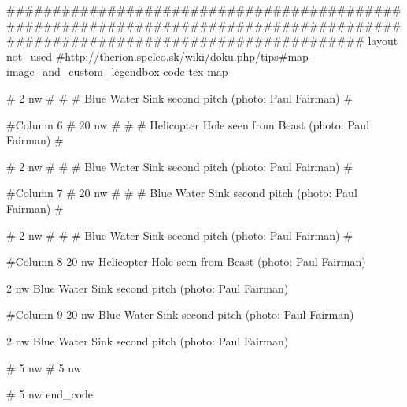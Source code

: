 #############################################################################################################################
layout not_used
  #http://therion.speleo.sk/wiki/doku.php/tips#map-image_and_custom_legendbox
  code tex-map


#       {2} {nw} {
#        
#	 \legendwidth=30cm\hsize=30cm\size[30]\vskip0.2cm
#        Blue Water Sink second pitch (photo: Paul Fairman)
#	 } 

#Column 6
#      {20} {nw} {
#       
#\legendwidth=30cm\hsize=30cm\size[30]\vskip0.2cm
#       Helicopter Hole seen from Beast (photo: Paul Fairman)
#       } 

#      {2} {nw} {
#
#\legendwidth=30cm\hsize=30cm\size[30]\vskip0.2cm
 #      Blue Water Sink second pitch (photo: Paul Fairman)
  #     } 

#Column 7
#      {20} {nw} {
#
#\legendwidth=30cm\hsize=30cm\size[30]\vskip0.2cm
 #      Blue Water Sink second pitch (photo: Paul Fairman)
#} 

           
#      {2} {nw} {
#
#\legendwidth=30cm\hsize=30cm\size[30]\vskip0.2cm
#       Blue Water Sink second pitch (photo: Paul Fairman)
#}
 
#Column 8
       {20} {nw} {
	\legendwidth=30cm\hsize=30cm\size[30]\vskip0.2cm
        Helicopter Hole seen from Beast (photo: Paul Fairman)
        } 

       {2} {nw} {
	\legendwidth=30cm\hsize=30cm\size[30]\vskip0.2cm
        Blue Water Sink second pitch (photo: Paul Fairman)
        } 

#Column 9
       {20} {nw} {
	\legendwidth=30cm\hsize=30cm\size[30]\vskip0.2cm
        Blue Water Sink second pitch (photo: Paul Fairman)
	} 

           
       {2} {nw} {
	\legendwidth=30cm\hsize=30cm\size[30]\vskip0.2cm
        Blue Water Sink second pitch (photo: Paul Fairman)
	} 

#       {5} {nw} {} 
#       {5} {nw} {} 


#       {5} {nw} {} 
end_code
